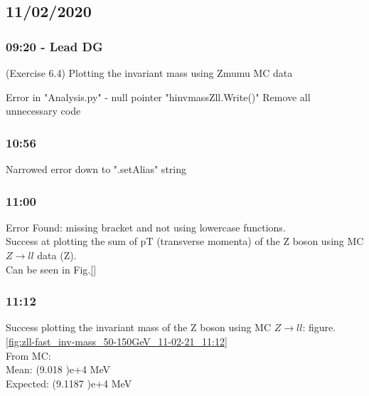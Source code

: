 
\subsection*{\textbf{11/02/2020}}

\subsubsection*{\textbf{09:20} - Lead DG}
(Exercise 6.4) Plotting the invariant mass using Zmumu MC data

Error in "Analysis.py" - null pointer "hinvmassZll.Write()"
Remove all unnecessary code\\


\subsubsection*{\textbf{10:56}}
Narrowed error down to ".setAlias" string

\subsubsection*{\textbf{11:00}}
Error Found:  missing bracket and not using lowercase functions.\\
Success at plotting the sum of pT (transverse momenta) of the Z boson using MC $Z \rightarrow ll$ data (Z).\\
Can be seen in Fig.\ref{}



\subsubsection*{\textbf{11:12}}
Success plotting the invariant mass of the Z boson using MC $Z \rightarrow ll$: figure.\ref{fig:zll-fast_inv-mass_50-150GeV_11-02-21_11:12}
\\
From MC:\\
Mean: (9.018 )e+4 MeV \\
Expected: (9.1187 )e+4 MeV\\

